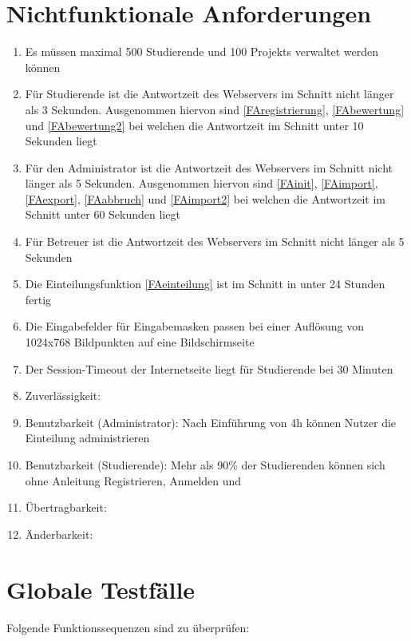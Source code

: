 \documentclass[parskip=full]{scrartcl}
\newcommand{\swtLabel}[1]{\textbf{/#1\arabic*0/}}
\begin{document}
\section{Nichtfunktionale Anforderungen}

\begin{enumerate}[label=\swtLabel{NF}]
  \item Es müssen maximal 500 Studierende und 100 \glspl{Projekt} verwaltet werden
  können
  \item Für Studierende ist die Antwortzeit des Webservers im Schnitt nicht
  länger als 3 Sekunden. Ausgenommen hiervon sind \ref{FAregistrierung}, 
  \ref{FAbewertung} und \ref{FAbewertung2} bei welchen die Antwortzeit im
  Schnitt unter 10 Sekunden liegt
  \item Für den Administrator ist die Antwortzeit des Webservers im Schnitt nicht
  länger als 5 Sekunden. Ausgenommen hiervon sind \ref{FAinit}, \ref{FAimport},
  \ref{FAexport}, \ref{FAabbruch} und \ref{FAimport2} bei welchen die Antwortzeit im Schnitt
  unter 60 Sekunden liegt
  \item Für Betreuer ist die Antwortzeit des Webservers im Schnitt nicht
  länger als 5 Sekunden
  \item Die Einteilungsfunktion \ref{FAeinteilung} ist im Schnitt in unter 24
  Stunden fertig
  \item Die Eingabefelder für Eingabemasken passen bei einer Auflösung von 
	1024x768 Bildpunkten auf eine Bildschirmseite
	\item Der Session-Timeout der Internetseite liegt für Studierende bei 30
	Minuten
	\item Zuverlässigkeit:  %
	\item Benutzbarkeit (Administrator): Nach Einführung von 4h können Nutzer die
	Einteilung administrieren
	\item Benutzbarkeit (Studierende): Mehr als 90\% der Studierenden können
	sich ohne Anleitung Registrieren, Anmelden und %
	\item Übertragbarkeit: %
	\item Änderbarkeit: %
	
 

\end{enumerate}
\section{Globale Testfälle}
Folgende Funktionssequenzen sind zu überprüfen:
\end{document}

